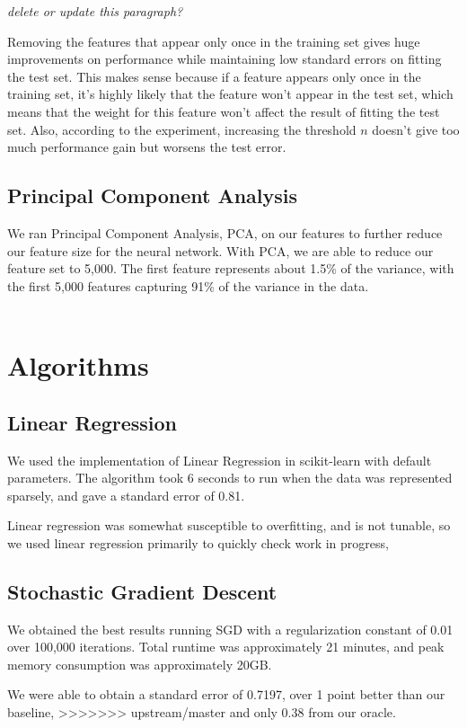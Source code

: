 \documentclass[journal]{IEEEtran}
\begin{document}
\textit{delete or update this paragraph?}
\par Removing the features that
appear only once in the training set gives huge improvements on performance
while maintaining low standard errors on fitting the test set. This makes sense
because if a
feature appears only once in the training set, it's highly likely that the
feature won't appear in the test set, which means that the weight for this feature
won't affect the result of fitting the test set. Also, according to the experiment,
increasing the threshold $n$ doesn't give too much performance gain but worsens
the test error.

\subsection{Principal Component Analysis}
We ran Principal Component Analysis, PCA, on our features to further reduce
our feature size for the neural network. With PCA, we
are able to reduce our feature set to 5,000.  The first feature
represents about 1.5\% of the variance, with the first 5,000 features
capturing 91\% of the variance in the data.
\\
\\

\section{Algorithms}

\subsection{Linear Regression}
We used the implementation of Linear Regression in scikit-learn with default
parameters. The algorithm took 6 seconds to run when the data was represented
sparsely, and gave a standard error of 0.81.
\\
\par Linear regression was somewhat susceptible to overfitting, and is not tunable, so we used
linear regression primarily to quickly check work in progress,

\subsection{Stochastic Gradient Descent}

We obtained the best results running SGD with a regularization constant of 0.01 over 100,000 iterations.  Total runtime was approximately 21 minutes, and peak memory consumption was approximately 20GB.
\\
\par We were able to obtain a standard error of 0.7197, over 1 point better than our baseline,
>>>>>>> upstream/master
and only 0.38 from our oracle.
\\
\end{document}
